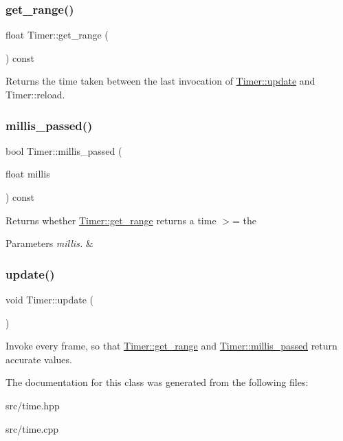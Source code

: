 \subsubsection{\texorpdfstring{get\+\_\+range()}{get\_range()}}
{\footnotesize\ttfamily float Timer\+::get\+\_\+range (\begin{DoxyParamCaption}{ }\end{DoxyParamCaption}) const}

Returns the time taken between the last invocation of \mbox{\hyperlink{class_timer_a745ad59b5a46744cd871a1129a25d74f}{Timer\+::update}} and Timer\+::reload. \mbox{\label{class_timer_ab8b727d8919cde4e920b9cbcfdeeaef1}} 
\subsubsection{\texorpdfstring{millis\+\_\+passed()}{millis\_passed()}}
{\footnotesize\ttfamily bool Timer\+::millis\+\_\+passed (\begin{DoxyParamCaption}\item[{float}]{millis }\end{DoxyParamCaption}) const}

Returns whether \mbox{\hyperlink{class_timer_aa24270892c235a1210575f09a362b9f0}{Timer\+::get\+\_\+range}} returns a time $>$= the
\begin{DoxyParams}{Parameters}
{\em millis.} & \\
\hline
\end{DoxyParams}
\mbox{\label{class_timer_a745ad59b5a46744cd871a1129a25d74f}} 
\subsubsection{\texorpdfstring{update()}{update()}}
{\footnotesize\ttfamily void Timer\+::update (\begin{DoxyParamCaption}{ }\end{DoxyParamCaption})}

Invoke every frame, so that \mbox{\hyperlink{class_timer_aa24270892c235a1210575f09a362b9f0}{Timer\+::get\+\_\+range}} and \mbox{\hyperlink{class_timer_ab8b727d8919cde4e920b9cbcfdeeaef1}{Timer\+::millis\+\_\+passed}} return accurate values. 

The documentation for this class was generated from the following files\+:\begin{DoxyCompactItemize}
\item 
src/time.\+hpp\item 
src/time.\+cpp\end{DoxyCompactItemize}
